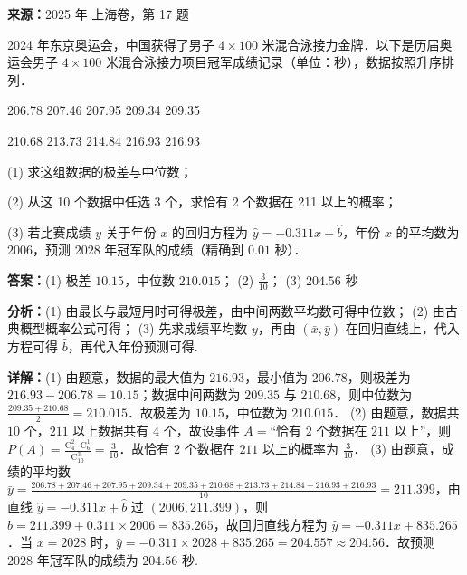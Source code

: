 \begin{question}[points=14]
\textbf{来源：}2025 年 上海卷，第 17 题\par
2024 年东京奥运会，中国获得了男子 $4 \times 100$ 米混合泳接力金牌．以下是历届奥运会男子 $4 \times 100$ 米混合泳接力项目冠军成绩记录（单位：秒），数据按照升序排列．



206.78  207.46  207.95  209.34  209.35

210.68  213.73  214.84  216.93  216.93



(1) 求这组数据的极差与中位数；

(2) 从这 10 个数据中任选 3 个，求恰有 2 个数据在 211 以上的概率；

(3) 若比赛成绩 $y$ 关于年份 $x$ 的回归方程为 $\hat{y} = -0.311x + \hat{b}$，年份 $x$ 的平均数为 $2006$，预测 $2028$ 年冠军队的成绩（精确到 $0.01$ 秒）．
\begin{solution}
\textbf{答案：}(1) 极差 $10.15$，中位数 $210.015$； (2) $\frac{3}{10}$； (3) $204.56$ 秒

\textbf{分析：}(1) 由最长与最短用时可得极差，由中间两数平均数可得中位数； (2) 由古典概型概率公式可得； (3) 先求成绩平均数 $y$，再由 $(\bar{x}, \bar{y})$ 在回归直线上，代入方程可得 $\hat{b}$，再代入年份预测可得.

\textbf{详解：}(1) 由题意，数据的最大值为 $216.93$，最小值为 $206.78$，则极差为 $216.93 - 206.78 = 10.15$；数据中间两数为 $209.35$ 与 $210.68$，则中位数为 $\frac{209.35 + 210.68}{2} = 210.015$．故极差为 $10.15$，中位数为 $210.015$．
(2) 由题意，数据共 $10$ 个，$211$ 以上数据共有 $4$ 个，故设事件 $A = $“恰有 $2$ 个数据在 $211$ 以上”，则 $P(A) = \frac{\mathrm{C}_4^2 \cdot \mathrm{C}_6^1}{\mathrm{C}_{10}^3} = \frac{3}{10}$．故恰有 $2$ 个数据在 $211$ 以上的概率为 $\frac{3}{10}$．
(3) 由题意，成绩的平均数 $\bar{y} = \frac{206.78 + 207.46 + 207.95 + 209.34 + 209.35 + 210.68 + 213.73 + 214.84 + 216.93 + 216.93}{10} = 211.399$，由直线 $\hat{y} = -0.311x + \hat{b}$ 过 $(2006, 211.399)$，则 $\hat{b} = 211.399 + 0.311 \times 2006 = 835.265$，故回归直线方程为 $\hat{y} = -0.311x + 835.265$．当 $x = 2028$ 时，$\hat{y} = -0.311 \times 2028 + 835.265 = 204.557 \approx 204.56$．故预测 $2028$ 年冠军队的成绩为 $204.56$ 秒.
\end{solution}
\end{question}

